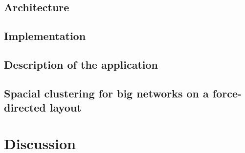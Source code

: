 \subsection{Architecture}
\subsection{Implementation}
\subsection{Description of the application}

\subsection{Spacial clustering for big networks on a force-directed layout}

\section{Discussion}


